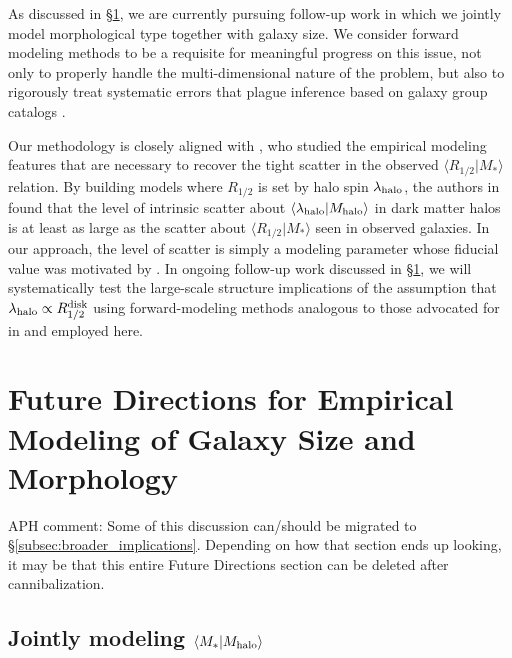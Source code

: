 \documentclass[usenatbib,usegraphicx,letterpaper]{mn2e}
\newcommand{\rhalf}{R_{1/2}}
\newcommand{\mstar}{M_{\ast}}
\newcommand{\mhalo}{M_{\rm halo}}
\newcommand{\mean}[2]{\langle{#1}\vert{#2}\rangle}
\begin{document}
As discussed in \S\ref{sec:future}, we are currently pursuing follow-up work in which we jointly model morphological type together with galaxy size. We consider forward modeling methods to be a requisite for meaningful progress on this issue, not only to properly handle the multi-dimensional nature of the problem, but also to rigorously treat systematic errors that plague inference based on galaxy group catalogs \citep[see][for a thorough discussion]{campbell_etal15}.

Our methodology is closely aligned with \citet{somerville_etal17}, who studied the empirical modeling features that are necessary to recover the tight scatter in the observed $\mean{\rhalf}{\mstar}$ relation. By building models where $\rhalf$ is set by halo spin $\lambda_{\rm halo}$, the authors in \citet{somerville_etal17} found that the level of intrinsic scatter about $\langle\lambda_{\rm halo}\vert\mhalo\rangle$ in dark matter halos is at least as large as the scatter about $\langle\rhalf\vert\mstar\rangle$ seen in observed galaxies. In our approach, the level of scatter is simply a modeling parameter whose fiducial value was motivated by \citet{somerville_etal17}. In ongoing follow-up work discussed in \S\ref{sec:future}, we will systematically test the large-scale structure implications of the assumption that $\lambda_{\rm halo}\propto\rhalf^{\rm disk}$ using forward-modeling methods analogous to those advocated for in \citet{somerville_etal17} and employed here.

\section{Future Directions for Empirical Modeling of Galaxy Size and Morphology}
\label{sec:future}

{\color{blue} APH comment: Some of this discussion can/should be migrated to \S\ref{subsec:broader_implications}. Depending on how that section ends up looking, it may be that this entire Future Directions section can be deleted after cannibalization.}


\subsection{Jointly modeling $\langle\mstar\vert\mhalo\rangle$}
\label{subsec:joint_smhm_modeling}
\end{document}
